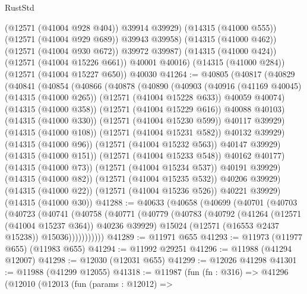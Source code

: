 \begin{lexlean}{RustStd}
\begin{coremodule}
            (@12571 (@41004 @928 @404))
            @39914
            @39929)
          (@14315 (@41000 @555))
          (@12571 (@41004 @929 @689))
          @39943
          @39958)
        (@14315 (@41000 @462))
        (@12571 (@41004 @930 @672))
        @39972
        @39987)
      (@14315 (@41000 @424))
      (@12571 (@41004 @15226 @661))
      @40001
      @40016)
    (@14315 (@41000 @284))
    (@12571 (@41004 @15227 @650))
    @40030
@41264 := @40805
    (@40817
      (@40829
        (@40841
          (@40854
            (@40866
              (@40878
                (@40890
                  (@40903
                    (@40916
                      (@41169 @40045)
                      (@14315 (@41000 @265))
                      (@12571 (@41004 @15228 @633))
                      @40059
                      @40074)
                    (@14315 (@41000 @358))
                    (@12571 (@41004 @15229 @616))
                    @40088
                    @40103)
                  (@14315 (@41000 @330))
                  (@12571 (@41004 @15230 @599))
                  @40117
                  @39929)
                (@14315 (@41000 @108))
                (@12571 (@41004 @15231 @582))
                @40132
                @39929)
              (@14315 (@41000 @96))
              (@12571 (@41004 @15232 @563))
              @40147
              @39929)
            (@14315 (@41000 @151))
            (@12571 (@41004 @15233 @548))
            @40162
            @40177)
          (@14315 (@41000 @73))
          (@12571 (@41004 @15234 @537))
          @40191
          @39929)
        (@14315 (@41000 @82))
        (@12571 (@41004 @15235 @532))
        @40206
        @39929)
      (@14315 (@41000 @22))
      (@12571 (@41004 @15236 @526))
      @40221
      @39929)
    (@14315 (@41000 @30))
@41288 := @40633
    (@40658
      (@40699
        (@40701
          (@40703
            (@40723
              (@40741
                (@40758
                  (@40771
                    (@40779
                      (@40783
                        (@40792
                          (@41264 (@12571 (@41004 @15237 @364)) @40236 @39929)
                          @15024
                          (@12571 (@16553 @2437 @15238))
                          @15036)))))))))))
@41289 := @11971 @655
@41293 := @11973 (@11977 @655) (@11983 @655)
@41294 := @11992 @29251
@41296 := @11988 (@41294 @12007)
@41298 := @12030 (@12031 @655)
@41299 := @12026 @41298
@41301 := @11988 (@41299 @12055)
@41318 := @11987
    (fun (fn : @316) =>
    @41296
      (@12010
        (@12013
          (fun (params : @12012) =>

\end{coremodule}
\end{lexlean}
